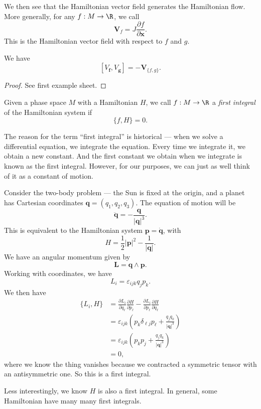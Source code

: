 \documentclass[a4paper]{article}
\begin{document}
We then see that the Hamiltonian vector field generates the Hamiltonian flow. More generally, for any $f: M \to \R$, we call
\[
  \mathbf{V}_f = J \frac{\partial f}{\partial \mathbf{x}}.
\]
This is the Hamiltonian vector field with respect to $f$ and $g$.

\begin{prop}
  We have
  \[
    [V_\mathbf{f}, V_\mathbf{g}] = - \mathbf{V}_{\{f, g\}}.
  \]
\end{prop}

\begin{proof}
  See first example sheet. %
\end{proof}

\begin{defi}
  Given a phase space $M$ with a Hamiltonian $H$, we call $f: M \to \R$ a \emph{first integral} of the Hamiltonian system if
  \[
    \{f, H\} = 0.
  \]
\end{defi}
The reason for the term ``first integral'' is historical --- when we solve a differential equation, we integrate the equation. Every time we integrate it, we obtain a new constant. And the first constant we obtain when we integrate is known as the first integral. However, for our purposes, we can just as well think of it as a constant of motion.

\begin{eg}
  Consider the two-body problem --- the Sun is fixed at the origin, and a planet has Cartesian coordinates $\mathbf{q} = (q_1, q_2, q_3)$. The equation of motion will be
  \[
    \ddot{\mathbf{q}} = - \frac{\mathbf{q}}{|\mathbf{q}|^3}.
  \]
  This is equivalent to the Hamiltonian system $\mathbf{p} = \dot{\mathbf{q}}$, with
  \[
    H = \frac{1}{2} |\mathbf{p}|^2 - \frac{1}{|\mathbf{q}|}.
  \]
  We have an angular momentum given by
  \[
    \mathbf{L} = \mathbf{q} \wedge \mathbf{p}.
  \]
  Working with coordinates, we have
  \[
    L_i = \varepsilon_{ijk} q_j p_k.
  \]
  We then have
  \begin{align*}
    \{L_i, H\} &= \frac{\partial L_i}{\partial q_\ell}\frac{\partial H}{\partial p_\ell} - \frac{\partial L_i}{\partial p_\ell} \frac{\partial H}{\partial q_\ell}\\
    &= \varepsilon_{ijk} \left(p_k \delta_{\ell j}p_\ell + \frac{q_j q_k}{|\mathbf{q}|^3}\right)\\
    &= \varepsilon_{ijk} \left(p_k p_j + \frac{q_j q_k}{|\mathbf{q}|^3}\right)\\
    &= 0,
  \end{align*}
  where we know the thing vanishes because we contracted a symmetric tensor with an antisymmetric one. So this is a first integral.

  Less interestingly, we know $H$ is also a first integral. In general, some Hamiltonian have many many first integrals.
\end{eg}
\end{document}

